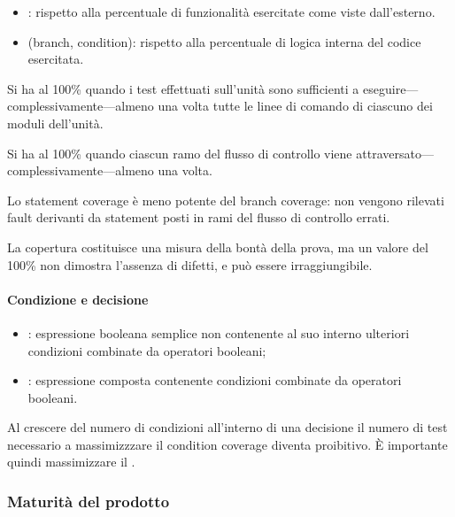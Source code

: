 \begin{itemize}
  \item {}: rispetto alla percentuale di funzionalità
    esercitate come viste dall'esterno.
  \item {} (branch, condition): rispetto alla
    percentuale di logica interna del codice esercitata.
\end{itemize}

Si ha  al 100\% quando i test effettuati sull'unità
sono sufficienti a eseguire---complessivamente---almeno una volta tutte le linee
di comando di ciascuno dei moduli dell'unità.

Si ha  al 100\% quando ciascun ramo del flusso di
controllo viene attraversato---complessivamente---almeno una volta.

Lo statement coverage è meno potente del branch coverage: non vengono rilevati
fault derivanti da statement posti in rami del flusso di controllo errati.

La copertura costituisce una misura della bontà della prova, ma un valore del
100\% non dimostra l'assenza di difetti, e può essere irraggiungibile.

\paragraph{Condizione e decisione}
\label{par:condizione_e_decisione}

\begin{itemize}
  \item {}: espressione booleana semplice non contenente al suo
    interno ulteriori condizioni combinate da operatori booleani;
  \item {}: espressione composta contenente condizioni combinate
    da operatori booleani.
\end{itemize}

Al crescere del numero di condizioni all'interno di una decisione il numero di
test necessario a massimizzzare il condition coverage diventa proibitivo. \`E
importante quindi massimizzare il .


\subsubsection{Maturità del prodotto}
\label{ssub:maturit_del_prodotto}


